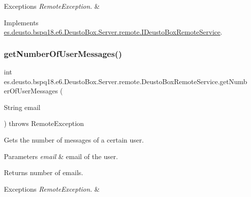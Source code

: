 \begin{DoxyExceptions}{Exceptions}
{\em Remote\+Exception.} & \\
\hline
\end{DoxyExceptions}


Implements \mbox{\hyperlink{interfacees_1_1deusto_1_1bspq18_1_1e6_1_1_deusto_box_1_1_server_1_1remote_1_1_i_deusto_box_remote_service_a80dac713a05e2f7ef7b8e8ac4aa4b13d}{es.\+deusto.\+bspq18.\+e6.\+Deusto\+Box.\+Server.\+remote.\+I\+Deusto\+Box\+Remote\+Service}}.

\mbox{\label{classes_1_1deusto_1_1bspq18_1_1e6_1_1_deusto_box_1_1_server_1_1remote_1_1_deusto_box_remote_service_a52c001ee4b0b93a416778e4b662da841}} 
\subsubsection{\texorpdfstring{get\+Number\+Of\+User\+Messages()}{getNumberOfUserMessages()}}
{\footnotesize\ttfamily int es.\+deusto.\+bspq18.\+e6.\+Deusto\+Box.\+Server.\+remote.\+Deusto\+Box\+Remote\+Service.\+get\+Number\+Of\+User\+Messages (\begin{DoxyParamCaption}\item[{String}]{email }\end{DoxyParamCaption}) throws Remote\+Exception}

Gets the number of messages of a certain user. 
\begin{DoxyParams}{Parameters}
{\em email} & email of the user. \\
\hline
\end{DoxyParams}
\begin{DoxyReturn}{Returns}
number of emails. 
\end{DoxyReturn}

\begin{DoxyExceptions}{Exceptions}
{\em Remote\+Exception.} & \\
\hline
\end{DoxyExceptions}



